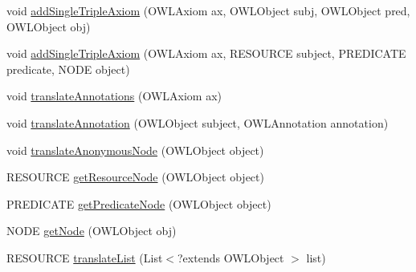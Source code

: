 \begin{DoxyCompactItemize}
\item 
void \hyperlink{classorg_1_1coode_1_1owlapi_1_1rdf_1_1model_1_1_abstract_translator_3_01_n_o_d_e_00_01_r_e_s_o_ubc597564c2cb8c8d2b0139cb32f3f91c_a8a44363440b8b4c850e8e8479ab1b6fd}{add\-Single\-Triple\-Axiom} (O\-W\-L\-Axiom ax, O\-W\-L\-Object subj, O\-W\-L\-Object pred, O\-W\-L\-Object obj)
\item 
void \hyperlink{classorg_1_1coode_1_1owlapi_1_1rdf_1_1model_1_1_abstract_translator_3_01_n_o_d_e_00_01_r_e_s_o_ubc597564c2cb8c8d2b0139cb32f3f91c_a4a3089b09b9d529dec2494d10e327c02}{add\-Single\-Triple\-Axiom} (O\-W\-L\-Axiom ax, R\-E\-S\-O\-U\-R\-C\-E subject, P\-R\-E\-D\-I\-C\-A\-T\-E predicate, N\-O\-D\-E object)
\item 
void \hyperlink{classorg_1_1coode_1_1owlapi_1_1rdf_1_1model_1_1_abstract_translator_3_01_n_o_d_e_00_01_r_e_s_o_ubc597564c2cb8c8d2b0139cb32f3f91c_ac56950a728af0f213530ae73af6fb33a}{translate\-Annotations} (O\-W\-L\-Axiom ax)
\item 
void \hyperlink{classorg_1_1coode_1_1owlapi_1_1rdf_1_1model_1_1_abstract_translator_3_01_n_o_d_e_00_01_r_e_s_o_ubc597564c2cb8c8d2b0139cb32f3f91c_a4f4a49c0f2b44d6efd92b7498146e31b}{translate\-Annotation} (O\-W\-L\-Object subject, O\-W\-L\-Annotation annotation)
\item 
void \hyperlink{classorg_1_1coode_1_1owlapi_1_1rdf_1_1model_1_1_abstract_translator_3_01_n_o_d_e_00_01_r_e_s_o_ubc597564c2cb8c8d2b0139cb32f3f91c_ab54eaf4ab40092f8c87372aff88ebf25}{translate\-Anonymous\-Node} (O\-W\-L\-Object object)
\item 
R\-E\-S\-O\-U\-R\-C\-E \hyperlink{classorg_1_1coode_1_1owlapi_1_1rdf_1_1model_1_1_abstract_translator_3_01_n_o_d_e_00_01_r_e_s_o_ubc597564c2cb8c8d2b0139cb32f3f91c_a3b10fb459589f2b73dd8fef9cef47cec}{get\-Resource\-Node} (O\-W\-L\-Object object)
\item 
P\-R\-E\-D\-I\-C\-A\-T\-E \hyperlink{classorg_1_1coode_1_1owlapi_1_1rdf_1_1model_1_1_abstract_translator_3_01_n_o_d_e_00_01_r_e_s_o_ubc597564c2cb8c8d2b0139cb32f3f91c_aa8ab53b97dca2e6e35e3e271cc84ad5f}{get\-Predicate\-Node} (O\-W\-L\-Object object)
\item 
N\-O\-D\-E \hyperlink{classorg_1_1coode_1_1owlapi_1_1rdf_1_1model_1_1_abstract_translator_3_01_n_o_d_e_00_01_r_e_s_o_ubc597564c2cb8c8d2b0139cb32f3f91c_afc726da1a2db72588238f37080231005}{get\-Node} (O\-W\-L\-Object obj)
\item 
R\-E\-S\-O\-U\-R\-C\-E \hyperlink{classorg_1_1coode_1_1owlapi_1_1rdf_1_1model_1_1_abstract_translator_3_01_n_o_d_e_00_01_r_e_s_o_ubc597564c2cb8c8d2b0139cb32f3f91c_a1d4f0d8dc538a5c6dec0c37cb99a4bc5}{translate\-List} (List$<$?extends O\-W\-L\-Object $>$ list)

\end{DoxyCompactItemize}
